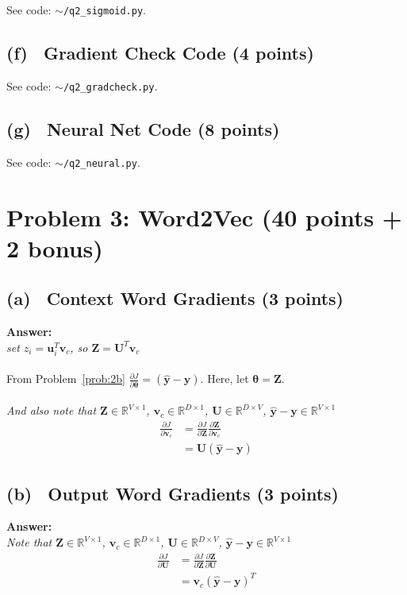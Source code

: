 \documentclass[fleqn]{MJD}
\newcommand{\problem}[1]{\chapter{Problem #1}}
\newcommand{\subproblem}[2]{\section{(#1)~ #2}}
\newcommand{\0}{\emptyset}
\begin{document}
\noindent See code: $\sim$\verb|/q2_sigmoid.py|.

\subproblem{f}{Gradient Check Code (4 points)}

\noindent See code: $\sim$\verb|/q2_gradcheck.py|.

\subproblem{g}{Neural Net Code (8 points)}

\noindent See code: $\sim$\verb|/q2_neural.py|.



\newpage

\problem{3: Word2Vec (40 points + 2 bonus)}

\subproblem{a}{Context Word Gradients (3 points)}

\noindent \textbf{Answer:} \\

\textit {set $z_{i}=\bm{u}_{i}^{T} \bm{v}_{c}$, so $\bm{Z}=\bm{U}^{T}\bm{v}_{c}$} \\
\\
\noindent From Problem~\ref{prob:2b} $\frac{\partial J}{\partial \bm{\theta}} = (\hat{\bm{y}} - \bm{y})$. Here, let $\bm{\theta} = \bm{Z}$. \\  \\
\textit {And also note that $\bm{Z} \in \mathbb{R}^{V \times 1}$, $\bm{v}_{c} \in  \mathbb{R}^{D \times 1}$, $\bm{U} \in \mathbb{R}^{D \times V}$,  $\bm{\hat{y}}-\bm{y} \in \mathbb{R}^{V \times 1}$}
\begin{align}
	\frac{\partial J}{\partial \bm{v}_{c}} &= %
	 		 \frac{\partial J}{\partial \bm{Z}} \frac{\partial \bm{Z}}{\partial \bm{v}_{c}} \nonumber \\
			&=
	 		\bm{U} (\hat{\bm{y}} - \bm{y}) \nonumber
\end{align}

\subproblem{b}{Output Word Gradients (3 points)}

\noindent \textbf{Answer:} \\

\textit {Note that $\bm{Z} \in \mathbb{R}^{V \times 1}$, $\bm{v}_{c} \in  \mathbb{R}^{D \times 1}$, $\bm{U} \in \mathbb{R}^{D \times V}$,  $\bm{\hat{y}}-\bm{y} \in \mathbb{R}^{V \times 1}$}
\begin{align}
	\frac{\partial J}{\partial \bm{U}} &= %
	 		 \frac{\partial J}{\partial \bm{Z}} \frac{\partial \bm{Z}}{\partial \bm{U}} \nonumber \\
			&=
	 		 \bm{v}_{c} (\hat{\bm{y}} - \bm{y})^{T} \nonumber
\end{align}
\end{document}
